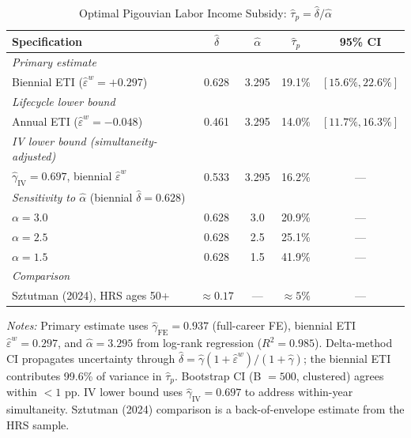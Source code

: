 \documentclass[12pt]{article}
\theoremstyle{definition}
\theoremstyle{remark}
\begin{document}
\begin{table}[htbp]
\centering
\caption{Optimal Pigouvian Labor Income Subsidy: $\hat{\tau}_p = \hat{\delta}/\hat{\alpha}$}
\label{tab:taup}
\begin{threeparttable}
\small
\begin{tabular}{p{6cm} c c c c}
\toprule
Specification & $\hat{\delta}$ & $\hat{\alpha}$ & $\hat{\tau}_p$ & 95\% CI \\
\midrule
\textit{Primary estimate} & & & & \\
\quad Biennial ETI ($\hat{\varepsilon}^w = +0.297$) & 0.628 & 3.295 & 19.1\% & $[15.6\%, 22.6\%]$ \\
\midrule
\textit{Lifecycle lower bound} & & & & \\
\quad Annual ETI ($\hat{\varepsilon}^w = -0.048$) & 0.461 & 3.295 & 14.0\% & $[11.7\%, 16.3\%]$ \\
\midrule
\textit{IV lower bound (simultaneity-adjusted)} & & & & \\
\quad $\hat{\gamma}_{\text{IV}} = 0.697$, biennial $\hat{\varepsilon}^w$ & 0.533 & 3.295 & 16.2\% & --- \\
\midrule
\textit{Sensitivity to $\hat{\alpha}$} (biennial $\hat{\delta} = 0.628$) & & & & \\
\quad $\alpha = 3.0$ & 0.628 & 3.0 & 20.9\% & --- \\
\quad $\alpha = 2.5$ & 0.628 & 2.5 & 25.1\% & --- \\
\quad $\alpha = 1.5$ & 0.628 & 1.5 & 41.9\% & --- \\
\midrule
\textit{Comparison} & & & & \\
\quad Sztutman (2024), HRS ages 50+ & $\approx 0.17$ & --- & $\approx 5\%$ & --- \\
\bottomrule
\end{tabular}
\begin{tablenotes}
\small
\item \textit{Notes:} Primary estimate uses $\hat{\gamma}_{\text{FE}} = 0.937$ (full-career
FE), biennial ETI $\hat{\varepsilon}^w = 0.297$, and $\hat{\alpha} = 3.295$ from log-rank
regression ($R^2 = 0.985$). Delta-method CI propagates uncertainty through
$\hat{\delta} = \hat{\gamma}(1 + \hat{\varepsilon}^w)/(1 + \hat{\gamma})$; the biennial ETI
contributes 99.6\% of variance in $\hat{\tau}_p$. Bootstrap CI (B $= 500$, clustered) agrees
within $< 1$ pp. IV lower bound uses $\hat{\gamma}_{\text{IV}} = 0.697$ to address within-year
simultaneity. Sztutman (2024) comparison is a back-of-envelope estimate from the HRS sample.
\end{tablenotes}
\end{threeparttable}
\end{table}
\end{document}
